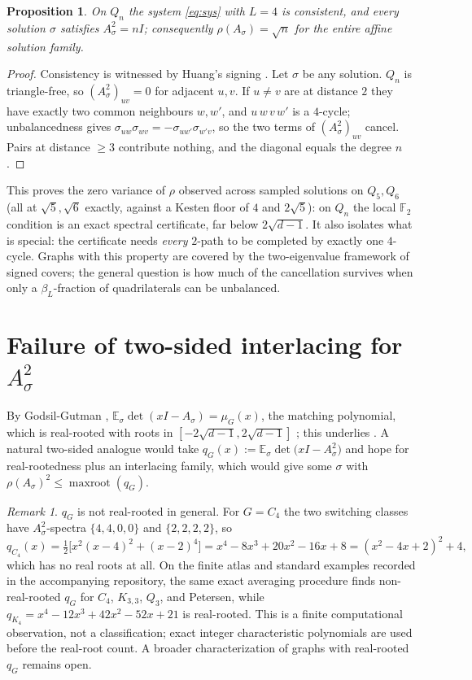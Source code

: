 \documentclass[11pt]{article}
\newtheorem{proposition}[lemma]{Proposition}
\theoremstyle{remark}
\newtheorem{remark}[lemma]{Remark}
\newcommand{\F}{\mathbb{F}}
\newcommand{\rhomax}{\rho}
\begin{document}
\begin{proposition}\label{prop:cube}
On $Q_n$ the system \eqref{eq:sys} with $L=4$ is consistent, and
\emph{every} solution $\sigma$ satisfies $A_\sigma^2=nI$; consequently
$\rhomax(A_\sigma)=\sqrt n$ for the entire affine solution family.
\end{proposition}

\begin{proof}
Consistency is witnessed by Huang's signing \cite{huang19}. Let $\sigma$
be any solution. $Q_n$ is triangle-free, so
$(A_\sigma^2)_{uv}=0$ for adjacent $u,v$. If $u\ne v$ are at distance
$2$ they have exactly two common neighbours $w,w'$, and
$u\,w\,v\,w'$ is a $4$-cycle; unbalancedness gives
$\sigma_{uw}\sigma_{wv}=-\sigma_{uw'}\sigma_{w'v}$, so the two terms of
$(A_\sigma^2)_{uv}$ cancel. Pairs at distance $\ge3$ contribute nothing,
and the diagonal equals the degree $n$.
\end{proof}

This proves the zero variance of $\rhomax$ observed across sampled solutions on $Q_5,Q_6$ (all at $\sqrt5,\sqrt6$ exactly, against a Kesten
floor of $4$ and $2\sqrt5$): on $Q_n$ the local $\F_2$ condition is an
exact spectral certificate, far below $2\sqrt{d-1}$. It also isolates
what is special: the certificate needs \emph{every} $2$-path to be
completed by exactly one $4$-cycle. Graphs with this property are
covered by the two-eigenvalue framework of signed covers; the general
question is how much of the cancellation survives when only a
$\beta_L$-fraction of quadrilaterals can be unbalanced.


\section{\texorpdfstring{Failure of two-sided interlacing for $A_\sigma^2$}{Failure of two-sided interlacing for A sigma squared}}

By Godsil-Gutman \cite{godsilgutman81},
$\mathbb{E}_\sigma\det(xI-A_\sigma)=\mu_G(x)$, the matching polynomial,
which is real-rooted with roots in $[-2\sqrt{d-1},2\sqrt{d-1}]$
\cite{heilmannlieb72}; this underlies \cite{mss15}. A natural two-sided
analogue would take
$q_G(x):=\mathbb{E}_\sigma\det\!\big(xI-A_\sigma^2\big)$ and hope for
real-rootedness plus an interlacing family, which would give some
$\sigma$ with $\rhomax(A_\sigma)^2\le\operatorname{maxroot}(q_G)$.

\begin{remark}\label{rem:qG}
$q_G$ is not real-rooted in general. For $G=C_4$ the two switching
classes have $A_\sigma^2$-spectra $\{4,4,0,0\}$ and $\{2,2,2,2\}$, so
\[
q_{C_4}(x)=\tfrac12\big[x^2(x-4)^2+(x-2)^4\big]
=x^4-8x^3+20x^2-16x+8=(x^2-4x+2)^2+4,
\]
which has no real roots at all. On the finite atlas and standard examples
recorded in the accompanying repository, the same exact averaging procedure
finds non-real-rooted $q_G$ for $C_4$, $K_{3,3}$, $Q_3$, and Petersen,
while $q_{K_4}=x^4-12x^3+42x^2-52x+21$ is real-rooted. This is a finite
computational observation, not a classification; exact integer characteristic
polynomials are used before the real-root count. A broader characterization of
graphs with real-rooted $q_G$ remains open.
\end{remark}
\end{document}

